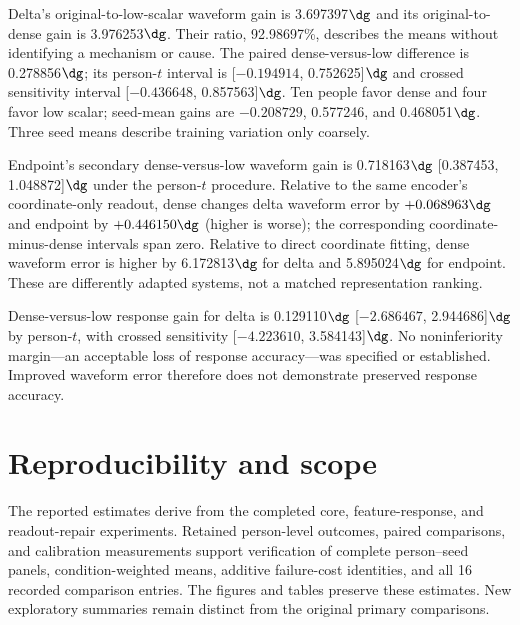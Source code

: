 \begin{table}[h]\centering\small
\caption{Every ViTPose procedure evaluated in the repair comparison. Waveform and response are degrees; NLE is dimensionless; response failures are weighted percentages. Direct is jointly fitted; all other methods use frozen encoders. This table preserves the coordinate-only references in addition to the three plotted repair arms.}
\label{tab:repairinventory}
\setlength{\tabcolsep}{4.3pt}
\end{table}

Delta's original-to-low-scalar waveform gain is 3.697397$\dg$ and its original-to-dense gain is 3.976253$\dg$. Their ratio, 92.98697\%, describes the means without identifying a mechanism or cause. The paired dense-versus-low difference is 0.278856$\dg$; its person-$t$ interval is [$-0.194914$, 0.752625]$\dg$ and crossed sensitivity interval [$-0.436648$, 0.857563]$\dg$. Ten people favor dense and four favor low scalar; seed-mean gains are $-0.208729$, 0.577246, and 0.468051$\dg$. Three seed means describe training variation only coarsely.

Endpoint's secondary dense-versus-low waveform gain is 0.718163$\dg$ [0.387453, 1.048872]$\dg$ under the person-$t$ procedure. Relative to the same encoder's coordinate-only readout, dense changes delta waveform error by $+0.068963\dg$ and endpoint by $+0.446150\dg$ (higher is worse); the corresponding coordinate-minus-dense intervals span zero. Relative to direct coordinate fitting, dense waveform error is higher by 6.172813$\dg$ for delta and 5.895024$\dg$ for endpoint. These are differently adapted systems, not a matched representation ranking.

Dense-versus-low response gain for delta is 0.129110$\dg$ [$-2.686467$, 2.944686]$\dg$ by person-$t$, with crossed sensitivity [$-4.223610$, 3.584143]$\dg$. No noninferiority margin---an acceptable loss of response accuracy---was specified or established. Improved waveform error therefore does not demonstrate preserved response accuracy.

\section{Reproducibility and scope}
\label{app:reproduction}
The reported estimates derive from the completed core, feature-response, and readout-repair experiments. Retained person-level outcomes, paired comparisons, and calibration measurements support verification of complete person--seed panels, condition-weighted means, additive failure-cost identities, and all 16 recorded comparison entries. The figures and tables preserve these estimates. New exploratory summaries remain distinct from the original primary comparisons.

